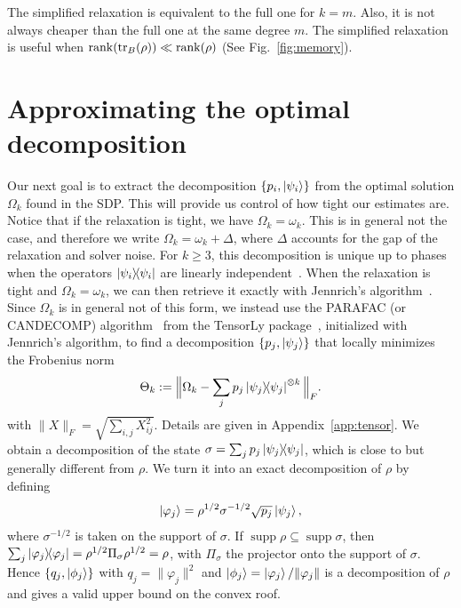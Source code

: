 \documentclass[aps,pra,twocolumn,showpacs,superscriptaddress,groupedaddress]{revtex4-2}
\begin{document}
The simplified relaxation is equivalent to the full one for $k=m$. Also, it is not always cheaper than the full one at the same degree $m$. The simplified relaxation is useful when $\operatorname{rank}(\tr_B(\rho)) \ll \operatorname{rank}(\rho)$ (See Fig.~\ref{fig:memory}).

\section{Approximating the optimal decomposition}\label{sec:extractingTheDecomposition}
Our next goal is to extract the decomposition $\{p_i, \ket{\psi_i}\}$ from the optimal solution $\Omega_k$ found in the SDP. This will provide us control of how tight our estimates are. Notice that if the relaxation is tight, we have $\Omega_k = \omega_k$. This is in general not the case, and therefore we write $\Omega_k = \omega_k + \Delta$, where $\Delta$ accounts for the gap of the relaxation and solver noise.
For $k \geq 3$, this decomposition is unique up to phases when the operators $\dyad{\psi_i}$ are linearly independent~\cite{Kruskal1977}. When the relaxation is tight and $\Omega_k = \omega_k$, we can then retrieve it exactly with Jennrich's algorithm~\cite{Harshman1970,Leurgans1993}. Since $\Omega_k$ is in general not of this form, we instead use the PARAFAC (or CANDECOMP) algorithm~\cite{Harshman1970,CarrollChang1970} from the TensorLy package~\cite{tensorly}, initialized with Jennrich's algorithm, to find a decomposition $\{p_j, \ket{\psi_j}\}$ that locally minimizes the Frobenius norm
\begin{equation}
    \Theta_k:=\Big\|\Omega_k - \sum_j p_j \dyad{\psi_j}^{\otimes k}\Big\|_F.
\end{equation}
with $\|X\|_F = \sqrt{\sum_{i,j} X_{ij}^2}$. Details are given in Appendix~\ref{app:tensor}.
We obtain a decomposition of the state $\sigma = \sum_j p_j \dyad{\psi_j}$, which is close to but generally different from $\rho$. We turn it into an exact decomposition of $\rho$ by defining
\begin{equation}\label{eq:repair}
    \ket{\varphi_j} = \rho^{1/2}\sigma^{-1/2}\sqrt{p_j}\ket{\psi_j},
\end{equation}
where $\sigma^{-1/2}$ is taken on the support of $\sigma$. If $\operatorname{supp} \rho \subseteq \operatorname{supp} \sigma$, then $\sum_j \dyad{\varphi_j} = \rho^{1/2}\Pi_\sigma\rho^{1/2} = \rho$, with $\Pi_\sigma$ the projector onto the support of $\sigma$. Hence $\{q_j,\ket{\phi_j}\}$ with $q_j = \|\varphi_j\|^2$ and $\ket{\phi_j}=\ket{\varphi_j}/\|\varphi_j\|$ is a decomposition of $\rho$ and gives a valid upper bound on the convex roof.
\end{document}
